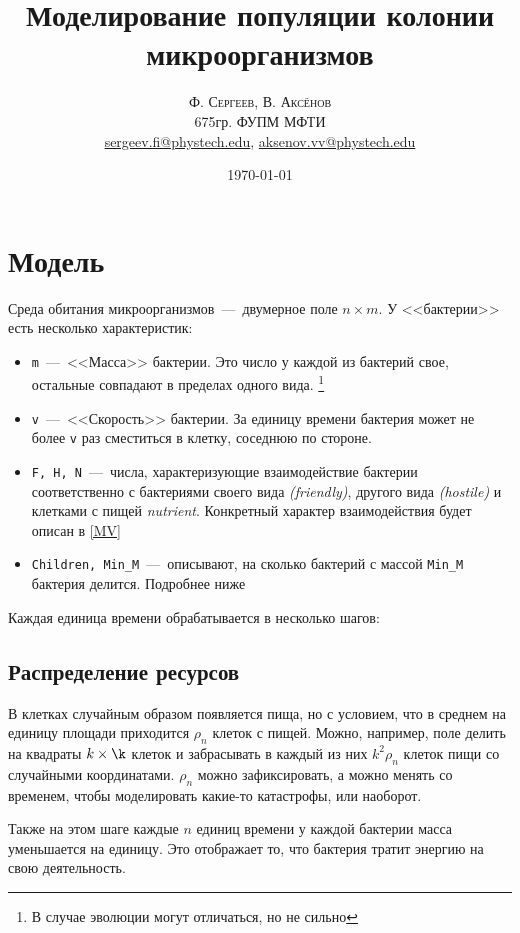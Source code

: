 \documentclass[11pt,twoside,twocolumn,russian,a4paper]{article}
\title{Моделирование популяции колонии микроорганизмов} %
\author{
	\textsc{Ф. Сергеев, В. Аксёнов} \\[0.5ex] %
	\normalsize 675гр. ФУПМ МФТИ \\ %
	\normalsize \href{mailto:sergeev.fi@phystech.edu}{sergeev.fi@phystech.edu}, \href{mailto:aksenov.vv@phystech.edu}{aksenov.vv@phystech.edu}	\normalsize 
}
\date{\today} %
\begin{document}
\maketitle


\section{Модель}

\noindent Среда обитания микроорганизмов~---~двумерное поле $n\times m$. %
У <<бактерии>> есть несколько характеристик:
\begin{itemize}
	\item \texttt{m}~---~<<Масса>> бактерии. Это число у каждой из бактерий свое, остальные совпадают в пределах одного вида. \footnote{%
																В случае эволюции могут отличаться, но не сильно}
	\item \texttt{v}~---~<<Скорость>> бактерии. За единицу времени бактерия может не более \texttt{v} раз сместиться в клетку, соседнюю по стороне.
	\item \texttt{F, H, N}~---~числа, характеризующие взаимодействие бактерии соответственно с бактериями 
		своего вида \textit{(friendly)}, 
		другого вида \textit{(hostile)} 
		и клетками с пищей \textit{nutrient}. Конкретный характер взаимодействия будет описан в \ref{MV}
	\item \texttt{Children, Min\_M}~---~описывают, на сколько бактерий с массой \texttt{Min\_M} бактерия делится. Подробнее ниже %
\end{itemize}
Каждая единица времени обрабатывается в несколько шагов:
\subsection{Распределение ресурсов}
	В клетках случайным образом появляется пища, но с условием, что в среднем на единицу площади приходится $\rho_n$ клеток с пищей. 
	Можно, например, поле делить на квадраты $k\times\k$ клеток и забрасывать в каждый из них $k^2\rho_n$ клеток пищи со случайными координатами. $\rho_n$ 
	можно зафиксировать, а можно  менять со временем, чтобы моделировать какие-то катастрофы, или наоборот. 

	Также на этом шаге каждые $n$ единиц времени у каждой бактерии масса уменьшается на единицу. Это отображает то, что бактерия тратит энергию на свою деятельность.
\end{document}
